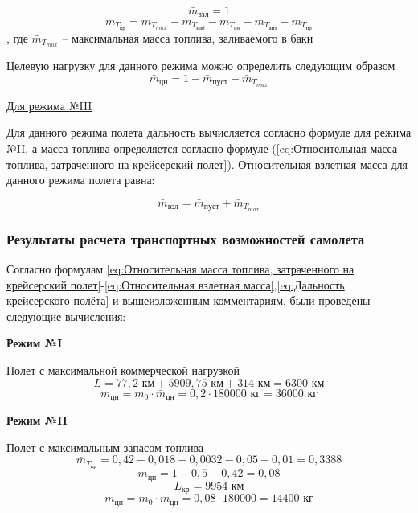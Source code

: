 $$\bar{m}_\text{взл} = 1$$
\begin{equation}
    \label{eq:Относительная масса топлива, затраченного на крейсерский полет}
    \bar{m}_{T_\text{кр}} = \bar{m}_{T_{max}} - \bar{m}_{T_\text{наб}} -\bar{m}_{T_\text{сн}} -\bar{m}_{T_\text{анз}} - \bar{m}_{T_\text{пр}}
\end{equation},
где $\bar{m}_{T_{max}}$ -- максимальная масса топлива, заливаемого в баки

Целевую нагрузку для данного режима можно определить следующим образом
\begin{equation}
    \label{eq:Целевая нагрузка}
    \bar{m}_\text{цн} = 1 - \bar{m}_\text{пуст} - \bar{m}_{T_{max}}
\end{equation}

\underline{Для режима №III}

Для данного режима полета дальность вычисляется согласно формуле для режима №II, а масса топлива определяется согласно формуле (\ref{eq:Относительная масса топлива, затраченного на крейсерский полет}). Относительная взлетная масса для данного режима полета равна:

\begin{equation}
    \label{eq:Относительная взлетная масса}
    \bar{m}_\text{взл} = \bar{m}_\text{пуст} + \bar{m}_{T_{max}} 
\end{equation}

\subsubsection{Результаты расчета транспортных возможностей самолета}
\label{sec:Результаты расчета транспортных возможностей самолета}

Согласно формулам \ref{eq:Относительная масса топлива, затраченного на крейсерский полет}-\ref{eq:Относительная взлетная масса},\ref{eq:Дальность крейсерского полёта} и вышеизложенным комментариям, были
проведены следующие вычисления:

\textbf{Режим №I}

Полет с максимальной коммерческой нагрузкой 
$$L = 77,2 \text{ км} + 5909,75 \text{ км} + 314 \text{ км} = 6300 \text{ км}$$
$$m_\text{цн} = m_0 \cdot \bar{m}_\text{цн} = 0,2 \cdot 180000 \text{ кг}= 36 000 \text{ кг}$$ 

\textbf{Режим №II}

Полет с максимальным запасом топлива 
$$\bar{m}_{T_\text{кр}} = 0,42 - 0,018 - 0,0032 - 0,05 - 0,01 = 0,3388$$
$$m_\text{цн} = 1 - 0,5 - 0,42 = 0,08$$
$$L_\text{кр} = 9954 \text{ км}$$
$$m_\text{цн} = m_0 \cdot \bar{m}_\text{цн} = 0,08 \cdot 180000 = 14400 \text{ кг}$$

